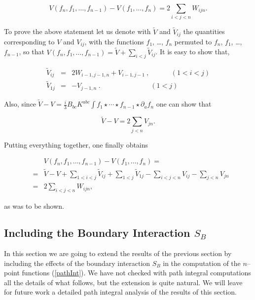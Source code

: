 \documentclass[a4paper,11pt]{article}
\begin{document}
$$
V\left( f_{n}, f_{1}, \dots, f_{n-1}\right) -V\left( f_{1}, \dots, 
f_{n}\right) =2\sum_{i<j<n}W_{ijn}.
$$

\noindent
To prove the above statement let us denote with $\widetilde{V}$ and 
$\widetilde{V}_{ij}$ the quantities corresponding to $V$ and $V_{ij}$, with
the functions $f_{1}$, \dots, $f_{n}$ permuted to $f_{n}$, $f_{1}$, 
\dots, $f_{n-1}$, so that $V\left( f_{n}, f_{1}, \dots, f_{n-1}\right) = 
\widetilde{V} + \sum_{i<j}\widetilde{V}_{ij}$. It is easy to show that,

\begin{eqnarray*}
\widetilde{V}_{ij} 
&=&2W_{i-1,j-1,n}+V_{i-1,j-1}\ ,\ \ \ \ \ \ \ \ \ \ \ \ \ \ 
\left( 1<i<j\right) \\
\widetilde{V}_{1j} &=&-V_{j-1,n}\ .\ \ \ \ \ \ \ \ \ \ \ \ \ \ \ 
\ \ \ \ \ \ \ \ \ \ \ \ \ \ \ \ \ \ \left( 1<j\right)
\end{eqnarray*}

\noindent
Also, since$\;\widetilde{V}-V=\frac{i}{3}B_{bc}K^{abc}\int f_{1}\star \cdots
\star f_{n-1}\star \partial _{a}f_{n}$ one can show that 

$$
\widetilde{V}-V=2\sum_{j<n}V_{jn}.
$$

\noindent
Putting everything together, one finally obtains 

\begin{eqnarray*}
&&V\left( f_{n}, f_{1}, \dots, f_{n-1}\right) -V\left( f_{1}, \dots, 
f_{n}\right) = \\
&=&\widetilde{V}-V+\sum_{1<i<j}\widetilde{V}_{ij}+\sum_{1<j}\widetilde{V}_{1j}
-\sum_{i<j<n}V_{ij}-\sum_{j<n}V_{jn} \\
&=&2\sum_{i<j<n}W_{ijn},
\end{eqnarray*}

\noindent
as was to be shown.


\subsection{Including the Boundary Interaction $S_{B}$}


In this section we are going to extend the results of the previous section
by including the effects of the boundary interaction $S_{B}$ in the
computation of the $n$--point functions (\ref{pathInt}). We have not checked
with path integral computations all the details of what follows, but the
extension is quite natural. We will leave for future work a detailed
path integral analysis of the results of this section.
\end{document}
